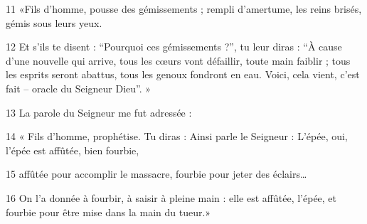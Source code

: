 11 «Fils d’homme, pousse des gémissements ; rempli d’amertume, les reins brisés, gémis sous leurs yeux.

12 Et s’ils te disent : “Pourquoi ces gémissements ?”, tu leur diras : “À cause d’une nouvelle qui arrive, tous les cœurs vont défaillir, toute main faiblir ; tous les esprits seront abattus, tous les genoux fondront en eau. Voici, cela vient, c’est fait – oracle du Seigneur Dieu”. »

13 La parole du Seigneur me fut adressée :

14 « Fils d’homme, prophétise. Tu diras : Ainsi parle le Seigneur : L’épée, oui, l’épée est affûtée, bien fourbie,

15 affûtée pour accomplir le massacre, fourbie pour jeter des éclairs…

16 On l’a donnée à fourbir, à saisir à pleine main : elle est affûtée, l’épée, et fourbie pour être mise dans la main du tueur.»